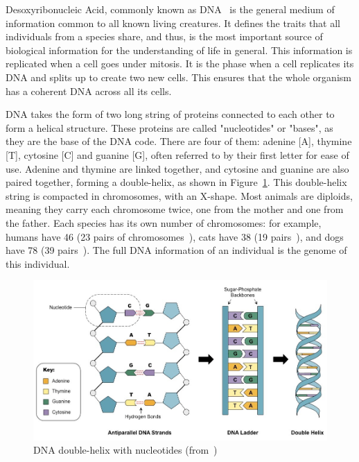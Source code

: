 
Desoxyribonucleic Acid, commonly known as DNA~\cite{wiki:DNA} is the general medium of information common to all known living creatures. It defines the traits that all individuals from a species share, and thus, is the most important source of biological information for the understanding of life in general. This information is replicated when a cell goes under mitosis. It is the phase when a cell replicates its DNA and splits up to create two new cells. This ensures that the whole organism has a coherent DNA across all its cells.

DNA takes the form of two long string of proteins connected to each other to form a helical structure. These proteins are called "nucleotides" or "bases", as they are the base of the DNA code. There are four of them: adenine [A], thymine [T], cytosine [C] and guanine [G], often referred to by their first letter for ease of use. Adenine and thymine are linked together, and cytosine and guanine are also paired together, forming a double-helix, as shown in Figure~\ref{fig:double-stranded-dnamed}. This double-helix string is compacted in chromosomes, with an X-shape. Most animals are diploids, meaning they carry each chromosome twice, one from the mother and one from the father. Each species has its own number of chromosomes: for example, humans have 46 (23 pairs of chromosomes~\cite{ncbi:hg19}), cats have 38 (19 pairs~\cite{ncbi:cat}), and dogs have 78 (39 pairs~\cite{ncbi:dog}). The full DNA information of an individual is the genome of this individual.


\begin{figure}[h]
	\centering
	\includegraphics[width=1\linewidth]{double-stranded-dna_med}
	\caption{DNA double-helix with nucleotides (from~\cite{cornell:dnastructure})}
	\label{fig:double-stranded-dnamed}
\end{figure}


